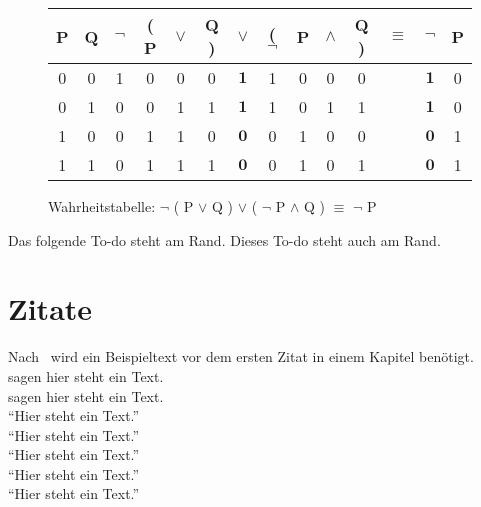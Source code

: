 \begin{figure}[H]
    \begin{center}
        \begin{tabular}{|c|c||c|c|c|c|c|c|c|c|c||c||c|c|}
            \hline
            P & Q & $\neg$ & ( P & $\vee$ & Q ) & $\vee$       & ( $\neg$ & P & $\wedge$ & Q ) & $\equiv$ & $\neg$       & P \\ \hline \hline
            0 & 0 & 1      & 0   & 0      & 0   & $\mathbf{1}$ & 1        & 0 & 0        & 0   &          & $\mathbf{1}$ & 0 \\ \hline
            0 & 1 & 0      & 0   & 1      & 1   & $\mathbf{1}$ & 1        & 0 & 1        & 1   &          & $\mathbf{1}$ & 0 \\ \hline
            1 & 0 & 0      & 1   & 1      & 0   & $\mathbf{0}$ & 0        & 1 & 0        & 0   &          & $\mathbf{0}$ & 1 \\ \hline
            1 & 1 & 0      & 1   & 1      & 1   & $\mathbf{0}$ & 0        & 1 & 0        & 1   &          & $\mathbf{0}$ & 1 \\ \hline
        \end{tabular}
        \caption{Wahrheitstabelle: $\neg$ ( P $\vee$ Q ) $\vee$ ( $\neg$ P $\wedge$ Q ) $\equiv$ $\neg$ P}\label{fig:figureFormulaTable}
    \end{center}
\end{figure}

Das folgende To-do  steht am Rand.
Dieses To-do  steht auch am Rand.


\section{Zitate}\label{sec:zitate}
Nach~\cite{Bartels2008} wird ein Beispieltext vor dem ersten Zitat in einem Kapitel benötigt.\\
\textcite{Yoshida1999} sagen hier steht ein Text. \\
\textcite*{Burns2003} sagen hier steht ein Text. \\
\enquote{Hier steht ein Text.}\autocite{Bartels2008} \\
\enquote{Hier steht ein Text.}\autocite[Vgl.][]{Bartels2008} \\
\enquote{Hier steht ein Text.}\autocite[][S. 200]{Bruno2009} \\
\enquote{Hier steht ein Text.}\autocite*[][S. 200]{Bruno2009} \\
\enquote{Hier steht ein Text.}\autocite{Wikipedia2011, Bruno2009}

